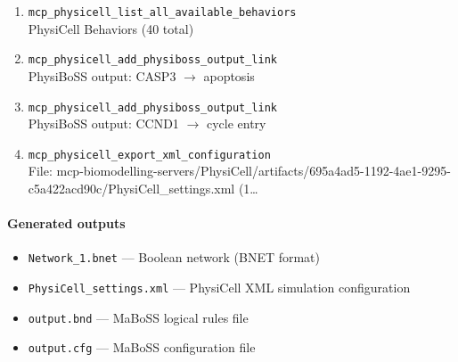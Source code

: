 \begin{enumerate}
\hfill\\
\RaggedRight PhysiBoSS input: intracellular TNF \ensuremath{\rightarrow} TNFRSF1A
\item[20.] \texttt{mcp\_\allowbreak{}physicell\_\allowbreak{}list\_\allowbreak{}all\_\allowbreak{}available\_\allowbreak{}behaviors}
\hfill\\
\RaggedRight PhysiCell Behaviors (40 total)
\item[21.] \texttt{mcp\_\allowbreak{}physicell\_\allowbreak{}add\_\allowbreak{}physiboss\_\allowbreak{}output\_\allowbreak{}link}
\hfill\\
\RaggedRight PhysiBoSS output: CASP3 \ensuremath{\rightarrow} apoptosis
\item[22.] \texttt{mcp\_\allowbreak{}physicell\_\allowbreak{}add\_\allowbreak{}physiboss\_\allowbreak{}output\_\allowbreak{}link}
\hfill\\
\RaggedRight PhysiBoSS output: CCND1 \ensuremath{\rightarrow} cycle entry
\item[23.] \texttt{mcp\_\allowbreak{}physicell\_\allowbreak{}export\_\allowbreak{}xml\_\allowbreak{}configuration}
\hfill\\
\RaggedRight File: mcp-biomodelling-servers/PhysiCell/artifacts/695a4ad5-1192-4ae1-9295-c5a422acd90c/PhysiCell\_settings.xml (1\ldots{}
\end{enumerate}
\endgroup

\paragraph{Generated outputs}
\begin{itemize}
\item \texttt{Network\_\allowbreak{}1.\allowbreak{}bnet} — Boolean network (BNET format)
\item \texttt{PhysiCell\_\allowbreak{}settings.\allowbreak{}xml} — PhysiCell XML simulation configuration
\item \texttt{output.\allowbreak{}bnd} — MaBoSS logical rules file
\item \texttt{output.\allowbreak{}cfg} — MaBoSS configuration file
\end{itemize}

